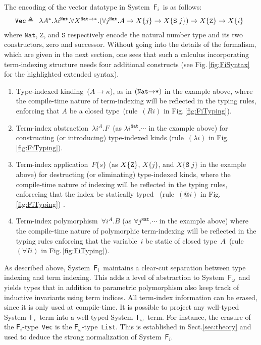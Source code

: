 \documentclass{llncs}
\newcommand{\Fig}[1]{Fig.\,\ref{fig:#1}}
\newcommand{\Fi}{\ensuremath{\mathsf{F}_i}}
\newcommand{\Fw}{\ensuremath{\mathsf{F}_\omega}}
\renewcommand{\S}[0]{Sect.\;}
\begin{document}
The encoding of the vector datatype in System~\Fi\ is as follows: 
\begin{equation*}\label{FiVecType}
\texttt{{Vec}}
\triangleq
\begin{array}[t]{l}
\lambda A^\mathtt{*}.\lambda
i^{\texttt{{Nat}}}.  \forall X^{\texttt{{Nat}}\to\mathtt{*}}.
  (\forall j^{\texttt{{Nat}}}.A\to X\{j\}\to X\{\texttt{{S}}\; j\})
  \to X\{\texttt{{Z}}\}
    \to X\{i\}
\end{array}
\end{equation*}
where $\texttt{{Nat}}$, $\mathtt Z$, and $\mathtt S$ respectively encode
the natural number type and its two constructors,  zero and successor.
Without going into the details of the formalism, which are given in the
next section, one sees that such a calculus incorporating term-indexing
structure needs four additional constructs (see \Fig{FiSyntax} for the
highlighted extended syntax).
\begin{enumerate}
\item 
  Type-indexed kinding~($A\to\kappa$), as in $(\texttt{{Nat}\ensuremath{\to}*})$
  in the example above, where the compile-time nature of term-indexing
  will be reflected in the typing rules, enforcing that $A$ be a closed
  type~(rule~$(Ri)$ in \Fig{FiTyping}).

\item 
  Term-index abstraction~$\lambda i^A.F$~(as $\lambda
  i^{\texttt{{Nat}}}.\cdots$ in the example above) for constructing (or
  introducing) type-indexed kinds (rule~$(\lambda i)$ in
  \Fig{FiTyping}).  

\item 
  Term-index application~$F\{s\}$ (as $X\{{\tt Z}\}$, $X\{j\}$, and
  $X\{\texttt{S}\;j\}$ in the example above) for destructing (or
  eliminating) type-indexed kinds, where the compile-time nature of
  indexing will be reflected in the typing rules, enforceing that the index be
  statically typed%
~(rule~$(@i)$ in \Fig{FiTyping}) .

\item 
  Term-index polymorphism~$\forall i^A.B$ (as $\forall
  j^{\texttt{{Nat}}}.\cdots$ in the example above) where the compile-time
  nature of polymorphic term-indexing will be reflected in the typing rules enforcing
  that the variable~$i$ be static of closed type~$A$~(rule~$(\forall
  Ii)$ in \Fig{FiTyping}).
\end{enumerate}

As described above, System~\Fi\ maintains a clear-cut separation between
type indexing and term indexing.  This adds a level of abstraction
to System~\Fw\ and yields types that in addition to parametric polymorphism
also keep track of inductive invariants using term indices. All term-index
information can be erased, since it is only used at compile-time.  
It is possible to project any well-typed System~\Fi\ term into a well-typed System~\Fw\ term.
For instance, the erasure of the \Fi-type~\texttt{Vec}
is the \Fw-type~\texttt{List}.  This is established in
\S\ref{sec:theory} and used to deduce the strong normalization of
System~\Fi.
\end{document}
